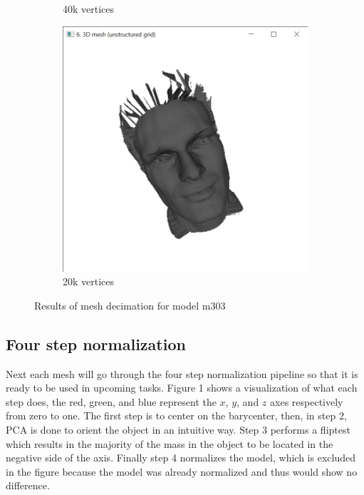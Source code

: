 \documentclass{bigdata}
\begin{document}
\begin{figure}[h!]
\begin{subfigure}[b]{0.3\linewidth}
    \caption{40k vertices}
  \end{subfigure}
  \begin{subfigure}[b]{0.3\linewidth}
    \includegraphics[width=\linewidth]{Pictures/postSub2.png}
    \caption{20k vertices}
  \end{subfigure}
  \caption{Results of mesh decimation for model m303}
  \label{fig:decimatedMesh}
\end{figure}

\subsection{Four step normalization}

Next each mesh will go through the four step normalization pipeline so that it is ready to be used in upcoming tasks. Figure 1 shows a visualization of what each step does, the red, green, and blue represent the $x$, $y$, and $z$ axes respectively from zero to one. The first step is to center on the barycenter, then, in step 2, PCA is done to orient the object in an intuitive way. Step 3 performs a fliptest which results in the majority of the mass in the object to be located in the negative side of the axis. Finally step 4 normalizes the model, which is excluded in the figure because the model was already normalized and thus would show no difference.
\end{document}
